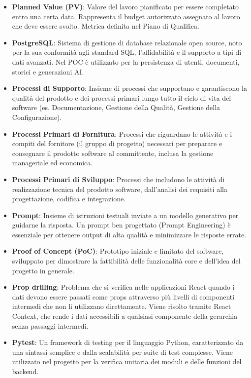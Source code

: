 \documentclass[11pt,a4paper]{article}
\begin{document}
\begin{itemize}
\item \textbf{Planned Value (PV)}: Valore del lavoro pianificato per essere completato entro una certa data. Rappresenta il budget autorizzato assegnato al lavoro che deve essere svolto. Metrica definita nel Piano di Qualifica.

\item \textbf{PostgreSQL}: Sistema di gestione di database relazionale 
open source, noto per la sua conformità agli standard SQL, 
l'affidabilità e il supporto a tipi di dati avanzati. Nel POC è utilizzato per la persistenza di utenti, documenti, storici e generazioni AI.

\item \textbf{Processi di Supporto}: Insieme di processi che supportano e garantiscono la qualità del prodotto e dei processi primari lungo tutto il ciclo di vita del software (es. Documentazione, Gestione della Qualità, Gestione della Configurazione).

\item \textbf{Processi Primari di Fornitura}: Processi che riguardano le attività e i compiti del fornitore (il gruppo di progetto) necessari per preparare e consegnare il prodotto software al committente, inclusa la gestione manageriale ed economica.

\item \textbf{Processi Primari di Sviluppo}: Processi che includono le attività di realizzazione tecnica del prodotto software, dall'analisi dei requisiti alla progettazione, codifica e integrazione.

\item \textbf{Prompt}: Insieme di istruzioni testuali inviate a un modello generativo per guidarne la risposta. Un prompt ben progettato (Prompt Engineering) è essenziale per ottenere output di alta qualità e minimizzare le risposte errate.

\item \textbf{Proof of Concept (PoC)}: Prototipo iniziale e limitato del software, sviluppato per dimostrare la fattibilità delle funzionalità core e dell'idea del progetto in generale.

\item \textbf{Prop drilling}: Problema che si verifica nelle applicazioni 
React quando i dati devono essere passati come props attraverso 
più livelli di componenti intermedi che non li utilizzano direttamente. Viene risolto tramite React Context, che rende i dati accessibili a qualsiasi componente della gerarchia senza passaggi intermedi.

\item \textbf{Pytest}: Un framework di testing per il linguaggio Python, caratterizzato da una sintassi semplice e dalla scalabilità per suite di test complesse. Viene utilizzato nel progetto per la verifica unitaria dei moduli e delle funzioni del backend.

\end{itemize}
\newpage
\end{document}
